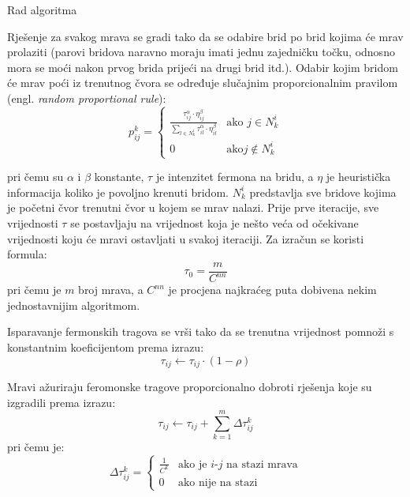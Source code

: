 \documentclass[times, utf8, zavrsni]{fer}
\begin{document}
\begin{algorithm}
  \caption{Rad algoritma}
  \label{algo:rad_algoritma}
  \begin{algorithmic}
  \REPEAT
    \ENDFOR

    \ENDFOR

  \end{algorithmic}
\end{algorithm}

Rješenje za svakog mrava se gradi tako da se odabire brid po brid kojima će mrav prolaziti (parovi bridova naravno moraju imati jednu
zajedničku točku, odnosno mora se moći nakon prvog brida prijeći na drugi brid itd.). Odabir kojim bridom će mrav poći iz trenutnog čvora
se određuje slučajnim proporcionalnim pravilom (engl. \textit{random proportional rule}):
\[
  p^k_{ij} =
  \begin{cases}
    \frac{\tau^\alpha_{ij}\cdot\eta^\beta_{ij}}{\sum_{l \in N^i_k}\tau^\alpha_{il}\cdot\eta^\beta_{il} } & \text{ako $j \in N^i_k$} \\
    0 & \text{ako} j \notin N^i_k
  \end{cases}
\]

pri čemu su $\alpha$ i $\beta$ konstante, $\tau$ je intenzitet fermona na bridu, a $\eta$ je heuristička informacija koliko je povoljno krenuti
 bridom. $N^i_k$ predstavlja sve bridove kojima je početni čvor trenutni čvor u kojem se mrav nalazi. Prije prve iteracije,
 sve vrijednosti $\tau$ se postavljaju na vrijednost koja je nešto veća od očekivane vrijednosti koju će mravi ostavljati u svakoj iteraciji. Za izračun se koristi formula:
$$
\tau_0 = \frac{m}{C^{nn}}
$$
pri čemu je $m$ broj mrava, a $C^{nn}$ je procjena najkraćeg puta dobivena nekim jednostavnijim algoritmom.

Isparavanje fermonskih tragova se vrši tako da se trenutna vrijednost pomnoži s konstantnim koeficijentom prema izrazu:
$$
\tau_{ij} \leftarrow \tau_{ij} \cdot (1 - \rho)
$$

Mravi ažuriraju feromonske tragove proporcionalno dobroti rješenja koje su izgradili prema izrazu:
$$
\tau_{ij} \leftarrow \tau_{ij} + \sum^m_{k=1} \Delta \tau^k_{ij}
$$
pri čemu je:
$$
\Delta \tau^k_{ij} =
\begin{cases}
  \frac{1}{C^k} & \text{ako je $i$-$j$ na stazi mrava} \\
  0 & \text{ako nije na stazi}
\end{cases}
$$
\end{document}
